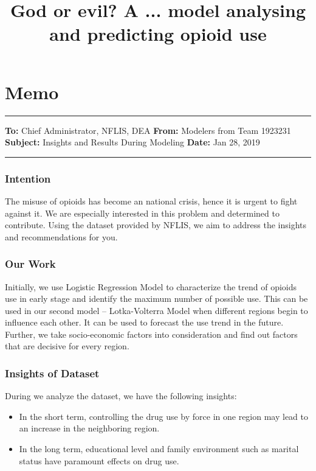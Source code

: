 \documentclass[12pt]{article}
\title{\large God or evil? A ... model analysing and predicting opioid use}  %
\begin{document}

\section*{Memo}
\noindent\rule{\textwidth}{0.8pt}
\textbf{To:} Chief Administrator, NFLIS, DEA \newline
\textbf{From:} Modelers from Team 1923231\newline
\textbf{Subject:} Insights and Results During Modeling\newline
\textbf{Date:} Jan 28, 2019\newline
\noindent\rule{\textwidth}{0.8pt}
\subsubsection*{Intention}
The misuse of opioids has become an national crisis, hence it is urgent to fight against it. We are especially interested in this problem and determined to contribute. Using the dataset provided by NFLIS, we aim to address the insights and recommendations for you.

\subsubsection*{Our Work}
Initially, we use Logistic Regression Model to characterize the trend of opioids use in early stage and identify the maximum number of possible use. This can be used in our second model -- Lotka-Volterra Model when different regions begin to influence each other. It can be used to forecast the use trend in the future. Further, we take socio-economic factors into consideration and find out factors that are decisive for every region.

\subsubsection*{Insights of Dataset}
During we analyze the dataset, we have the following insights:
\begin{itemize}
	\item In the short term, controlling the drug use by force in one region may lead to an increase in the neighboring region.
	\item In the long term, educational level and family environment such as marital status have paramount effects on drug use.
\end{itemize}
\end{document}

